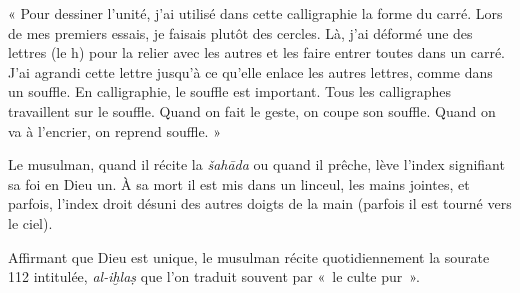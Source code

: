 « Pour dessiner l'unité, j'ai utilisé dans cette calligraphie la forme
du carré. Lors de mes premiers essais, je faisais plutôt des cercles.
Là, j'ai déformé une des lettres (le h) pour la relier avec les autres
et les faire entrer toutes dans un carré. J'ai agrandi cette lettre
jusqu'à ce qu'elle enlace les autres lettres, comme dans un souffle. En
calligraphie, le souffle est important. Tous les calligraphes
travaillent sur le souffle. Quand on fait le geste, on coupe son
souffle. Quand on va à l'encrier, on reprend souffle. » 



Le musulman, quand il récite la \emph{šahāda} ou quand il prêche, lève
l'index signifiant sa foi en Dieu un. À sa mort il est mis dans un
linceul, les mains jointes, et parfois, l'index droit désuni des autres
doigts de la main (parfois il est tourné vers le ciel).




Affirmant que Dieu est unique, le musulman récite quotidiennement la
sourate 112 intitulée, \emph{al-iḫlaṣ} que l'on traduit souvent par «~le
culte pur~».


\begin{table}[h!]
\caption{sourate 112 , \emph{al-iḫlaṣ}, «~le
culte pur~»}
\end{table}



